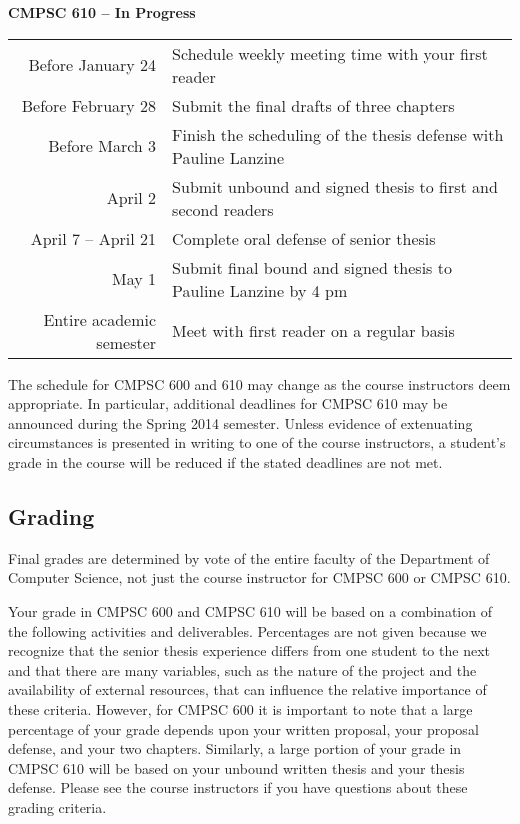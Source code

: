 \noindent
{\bf CMPSC 610 -- In Progress}
\begin{center}
\begin{tabular}{r|l}
\hline
Before January 24 & Schedule weekly meeting time with your first reader \\ 
Before February 28 & Submit the final drafts of three chapters \\
Before March 3 & Finish the scheduling of the thesis defense with Pauline Lanzine \\
April 2 & Submit unbound and signed thesis to first and second readers \\
April 7 -- April 21 & Complete oral defense of senior thesis \\
May 1 & Submit final bound and signed thesis to Pauline Lanzine by 4 pm\\
\hline
Entire academic semester & Meet with first reader on a regular basis \\ 
\hline
\end{tabular}
\end{center}

\noindent The schedule for CMPSC 600 and 610 may change as the course instructors deem appropriate. In particular,
additional deadlines for CMPSC 610 may be announced during the Spring 2014 semester. Unless evidence of extenuating
circumstances is presented in writing to one of the course instructors, a student's grade in the course will be reduced
if the stated deadlines are not met.

\subsection*{Grading}

Final grades are determined by vote of the entire faculty of the Department of Computer Science, not just the course
instructor for CMPSC 600 or CMPSC 610.

Your grade in CMPSC 600 and CMPSC 610 will be based on a combination of the following activities and deliverables.
Percentages are not given because we recognize that the senior thesis experience differs from one student to the next
and that there are many variables, such as the nature of the project and the availability of external resources, that
can influence the relative importance of these criteria. However, for CMPSC 600 it is important to note that a large
percentage of your grade depends upon your written proposal, your proposal defense, and your two chapters. Similarly, a
large portion of your grade in CMPSC 610 will be based on your unbound written thesis and your thesis defense. Please
see the course instructors if you have questions about these grading criteria.

